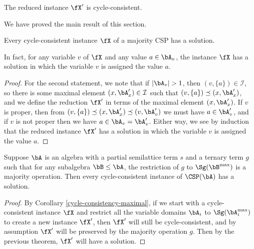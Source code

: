 \begin{cor} The reduced instance $\fX'$ is cycle-consistent.
\end{cor}

We have proved the main result of this section.

\begin{thm} Every cycle-consistent instance $\fX$ of a majority CSP has a solution.

In fact, for any variable $v$ of $\fX$ and any value $a \in \bA_v$, the instance $\fX$ has a solution in which the variable $v$ is assigned the value $a$.
\end{thm}
\begin{proof} For the second statement, we note that if $|\bA_v| > 1$, then $(v,\{a\}) \in \mathcal{I}$, so there is some maximal element $(x,\bA_x') \in \mathcal{I}$ such that $(v,\{a\}) \preceq (x,\bA_x')$, and we define the reduction $\fX'$ in terms of the maximal element $(x,\bA_x')$. If $v$ is proper, then from $(v,\{a\}) \preceq (x,\bA_x') \preceq (v,\bA_v')$ we must have $a \in \bA_v'$, and if $v$ is not proper then we have $a \in \bA_v = \bA_v'$. Either way, we see by induction that the reduced instance $\fX'$ has a solution in which the variable $v$ is assigned the value $a$.
\end{proof}

\begin{cor} Suppose $\bA$ is an algebra with a partial semilattice term $s$ and a ternary term $g$ such that for any subalgebra $\bB \le \bA$, the restriction of $g$ to $\Sg(\bB^{\max})$ is a majority operation. Then every cycle-consistent instance of $\CSP(\bA)$ has a solution.
\end{cor}
\begin{proof} By Corollary \ref{cycle-consistency-maximal}, if we start with a cycle-consistent instance $\fX$ and restrict all the variable domains $\bA_i$ to $\Sg(\bA_i^{\max})$ to create a new instance $\fX'$, then $\fX'$ will still be cycle-consistent, and by assumption $\fX'$ will be preserved by the majority operation $g$. Then by the previous theorem, $\fX'$ will have a solution.
\end{proof}


